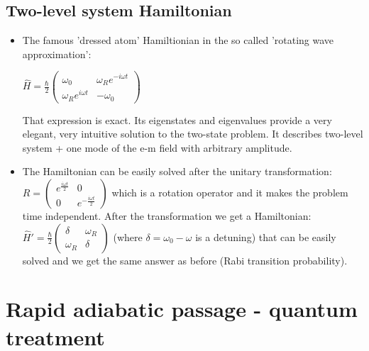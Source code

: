 \documentclass[AtomicOptical1Notes.tex]{subfiles}
\begin{document}
\subsection{Two-level system Hamiltonian}
		\begin{itemize}
			\item The famous 'dressed atom' Hamiltionian in the so called 'rotating wave approximation':
			
			\begin{center} $ \hat{H} = \frac{\hbar}{2} \left( \begin{array}{cc}
										   \omega_0 & \omega_Re^{-i\omega t} \\
										   \omega_Re^{i\omega t} & -\omega_0 \end{array}
											 \right) $ \end{center}
	
That expression is exact. Its eigenstates and eigenvalues provide a very elegant, very intuitive solution to the two-state problem. It describes two-level system + one mode of the e-m field with arbitrary amplitude.
			\item The Hamiltonian can be easily solved after the unitary transformation: $ R = \left( \begin{array}{cc}
									e^{\frac{i\omega t}{2}} & 0 \\
									0 & e^{-\frac{i\omega t}{2}} \end{array}
									\right) $ which is a rotation operator and it makes the problem time independent. After the transformation we get a Hamiltonian: $ \hat{H}'=\frac{\hbar}{2} \left( \begin{array}{cc}
								 \delta & \omega_R \\
								 \omega_R & \delta \end{array}
								 \right)$ (where $ \delta = \omega_0-\omega $ is a detuning) that can be easily solved and we get the same answer as before (Rabi transition probability).
			
		\end{itemize}

\section{Rapid adiabatic passage - quantum treatment}
\end{document}
